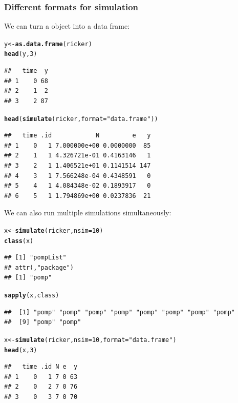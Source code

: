 \documentclass{beamer}\usepackage[]{graphicx}\usepackage[]{color}
\makeatletter
\newcommand{\hlnum}[1]{\textcolor[rgb]{0.686,0.059,0.569}{#1}}%
\newcommand{\hlstr}[1]{\textcolor[rgb]{0.192,0.494,0.8}{#1}}%
\newcommand{\hlstd}[1]{\textcolor[rgb]{0.345,0.345,0.345}{#1}}%
\newcommand{\hlkwb}[1]{\textcolor[rgb]{0.69,0.353,0.396}{#1}}%
\newcommand{\hlkwc}[1]{\textcolor[rgb]{0.333,0.667,0.333}{#1}}%
\newcommand{\hlkwd}[1]{\textcolor[rgb]{0.737,0.353,0.396}{\textbf{#1}}}%
\newenvironment{kframe}{%
 \def\at@end@of@kframe{}%
 \ifinner\ifhmode%
  \def\at@end@of@kframe{\end{minipage}}%
  \begin{minipage}{\columnwidth}%
 \fi\fi%
 \def\FrameCommand##1{\hskip\@totalleftmargin \hskip-\fboxsep
 \colorbox{shadecolor}{##1}\hskip-\fboxsep
     \hskip-\linewidth \hskip-\@totalleftmargin \hskip\columnwidth}%
 \MakeFramed {\advance\hsize-\width
   \@totalleftmargin\z@ \linewidth\hsize
   \@setminipage}}%
 {\par\unskip\endMakeFramed%
 \at@end@of@kframe}
\newenvironment{knitrout}{}{} %
\makeatother
\begin{document}
\begin{frame}[fragile]

\frametitle{Different formats for simulation}


\bi
\item We can turn a  object into a data frame:
\ei
\begin{knitrout}\small
{}\color{fgcolor}\begin{kframe}
\begin{alltt}
\hlstd{y} \hlkwb{<-} \hlkwd{as.data.frame}\hlstd{(ricker)}
\hlkwd{head}\hlstd{(y,}\hlnum{3}\hlstd{)}
\end{alltt}
\begin{verbatim}
##   time  y
## 1    0 68
## 2    1  2
## 3    2 87
\end{verbatim}
\begin{alltt}
\hlkwd{head}\hlstd{(}\hlkwd{simulate}\hlstd{(ricker,}\hlkwc{format}\hlstd{=}\hlstr{"data.frame"}\hlstd{))}
\end{alltt}
\begin{verbatim}
##   time .id            N         e   y
## 1    0   1 7.000000e+00 0.0000000  85
## 2    1   1 4.326721e-01 0.4163146   1
## 3    2   1 1.406521e+01 0.1141514 147
## 4    3   1 7.566248e-04 0.4348591   0
## 5    4   1 4.084348e-02 0.1893917   0
## 6    5   1 1.794869e+00 0.0237836  21
\end{verbatim}
\end{kframe}
\end{knitrout}

\bi
\item We can also run multiple simulations simultaneously:
\ei
\begin{knitrout}\small
{}\color{fgcolor}\begin{kframe}
\begin{alltt}
\hlstd{x} \hlkwb{<-} \hlkwd{simulate}\hlstd{(ricker,}\hlkwc{nsim}\hlstd{=}\hlnum{10}\hlstd{)}
\hlkwd{class}\hlstd{(x)}
\end{alltt}
\begin{verbatim}
## [1] "pompList"
## attr(,"package")
## [1] "pomp"
\end{verbatim}
\begin{alltt}
\hlkwd{sapply}\hlstd{(x,class)}
\end{alltt}
\begin{verbatim}
##  [1] "pomp" "pomp" "pomp" "pomp" "pomp" "pomp" "pomp" "pomp"
##  [9] "pomp" "pomp"
\end{verbatim}
\begin{alltt}
\hlstd{x} \hlkwb{<-} \hlkwd{simulate}\hlstd{(ricker,}\hlkwc{nsim}\hlstd{=}\hlnum{10}\hlstd{,}\hlkwc{format}\hlstd{=}\hlstr{"data.frame"}\hlstd{)}
\hlkwd{head}\hlstd{(x,}\hlnum{3}\hlstd{)}
\end{alltt}
\begin{verbatim}
##   time .id N e  y
## 1    0   1 7 0 63
## 2    0   2 7 0 76
## 3    0   3 7 0 70
\end{verbatim}
\end{kframe}
\end{knitrout}

\end{frame}
\end{document}
